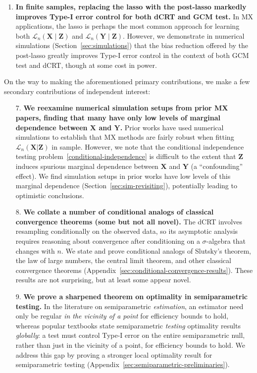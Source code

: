 \documentclass[aos]{imsart}
\theoremstyle{plain}
\theoremstyle{remark}
\newcommand{\prx}{\bm X}								%
\newcommand{\prz}{\bm Z}								%
\newcommand{\pry}{{\bm Y}}								%
\newcommand{\law}{\mathcal L}							%
\begin{document}
\begin{enumerate}
	\item \textbf{In finite samples, replacing the lasso with the post-lasso markedly improves Type-I error control for both dCRT and GCM test.} In MX applications, the lasso is perhaps the most common approach for learning both $\law_n(\prx \mid \prz)$ and $\law_n(\pry \mid \prz)$. However, we demonstrate in numerical simulations (Section~\ref{sec:simulations}) that the bias reduction offered by the post-lasso greatly improves Type-I error control in the context of both GCM test and dCRT, though at some cost in power. 
\end{enumerate}

On the way to making the aforementioned primary contributions, we make a few secondary contributions of independent interest:

\begin{enumerate}
	\item[7.] \textbf{We reexamine numerical simulation setups from prior MX papers, finding that many have only low levels of marginal dependence between $\prx$ and $\pry$.} Prior works have used numerical simulations to establish that MX methods are fairly robust when fitting $\mathcal L_n(\prx|\prz)$ in sample. However, we note that the conditional independence testing problem~\eqref{conditional-independence} is difficult to the extent that $\prz$ induces spurious marginal dependence between $\prx$ and $\pry$ (a ``confounding'' effect). We find simulation setups in prior works have low levels of this marginal dependence (Section~\ref{sec:sim-revisiting}), potentially leading to optimistic conclusions.
	
	\item[8.] \textbf{We collate a number of conditional analogs of classical convergence theorems (some but not all novel).} The dCRT involves resampling conditionally on the observed data, so its asymptotic analysis requires reasoning about convergence after conditioning on a $\sigma$-algebra that changes with $n$. We state and prove conditional analogs of Slutsky's theorem, the law of large numbers, the central limit theorem, and other classical convergence theorems (Appendix~\ref{sec:conditional-convergence-results}). These results are not surprising, but at least some appear novel.
	
	\item[9.] \textbf{We prove a sharpened theorem on optimality in semiparametric testing.} In the literature on semiparametric \textit{estimation}, an estimator need only be regular \textit{in the vicinity of a point} for efficiency bounds to hold, whereas popular textbooks \citep{VDV1998, Kosorok2008} state semiparametric \textit{testing} optimality results \textit{globally}: a test must control Type-I error on the entire semiparametric null, rather than just in the vicinity of a point, for efficiency bounds to hold. We address this gap by proving a stronger local optimality result for semiparametric testing (Appendix~\ref{sec:semiparametric-preliminaries}).
\end{enumerate}
\end{document}
